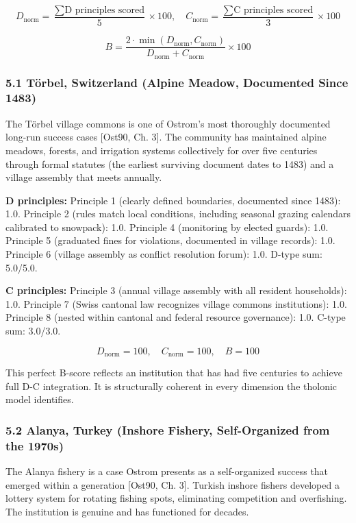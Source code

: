 \documentclass[
  11pt,
  letterpaper,
]{article}
\begin{document}
\[D_{\text{norm}} = \frac{\sum \text{D principles scored}}{5} \times 100, \quad C_{\text{norm}} = \frac{\sum \text{C principles scored}}{3} \times 100\]

\[B = \frac{2 \cdot \min(D_{\text{norm}}, C_{\text{norm}})}{D_{\text{norm}} + C_{\text{norm}}} \times 100\]

\subsubsection{5.1 Törbel, Switzerland (Alpine Meadow, Documented Since
1483)}\label{tuxf6rbel-switzerland-alpine-meadow-documented-since-1483}

The Törbel village commons is one of Ostrom's most thoroughly documented
long-run success cases {[}Ost90, Ch. 3{]}. The community has maintained
alpine meadows, forests, and irrigation systems collectively for over
five centuries through formal statutes (the earliest surviving document
dates to 1483) and a village assembly that meets annually.

\textbf{D principles:} Principle 1 (clearly defined boundaries,
documented since 1483): 1.0. Principle 2 (rules match local conditions,
including seasonal grazing calendars calibrated to snowpack): 1.0.
Principle 4 (monitoring by elected guards): 1.0. Principle 5 (graduated
fines for violations, documented in village records): 1.0. Principle 6
(village assembly as conflict resolution forum): 1.0. D-type sum:
5.0/5.0.

\textbf{C principles:} Principle 3 (annual village assembly with all
resident households): 1.0. Principle 7 (Swiss cantonal law recognizes
village commons institutions): 1.0. Principle 8 (nested within cantonal
and federal resource governance): 1.0. C-type sum: 3.0/3.0.

\[D_{\text{norm}} = 100, \quad C_{\text{norm}} = 100, \quad B = 100\]

This perfect B-score reflects an institution that has had five centuries
to achieve full D-C integration. It is structurally coherent in every
dimension the tholonic model identifies.

\subsubsection{5.2 Alanya, Turkey (Inshore Fishery, Self-Organized from
the
1970s)}\label{alanya-turkey-inshore-fishery-self-organized-from-the-1970s}

The Alanya fishery is a case Ostrom presents as a self-organized success
that emerged within a generation {[}Ost90, Ch. 3{]}. Turkish inshore
fishers developed a lottery system for rotating fishing spots,
eliminating competition and overfishing. The institution is genuine and
has functioned for decades.
\end{document}
